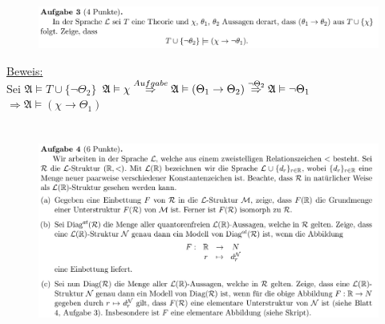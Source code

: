 \documentclass[a4paper]{scrartcl}
\begin{document}
\section*{}%
\label{sec:aufgabe_3}

    \begin{figure}[H]
        \centering
        \includegraphics[scale=0.3]{./A-3.png}
        \label{fig:}
    \end{figure}

    \underline{Beweis:}\\
        Sei $\mathfrak{A} \vDash T \cup \{\neg \Theta_2\}$
        $\mathfrak{A} \vDash \chi\\
        \overset{Aufgabe}{\Rightarrow} \mathfrak{A} \vDash (\Theta_1 \rightarrow \Theta_2)\\
        \overset{\neg \Theta_2}{\Rightarrow} \mathfrak{A} \vDash \neg \Theta_1$\\
        $\Rightarrow \mathfrak{A} \vDash (\chi \rightarrow \Theta_1)$\\


\section*{}%
\label{sec:aufgabe_4}

    \begin{figure}[H]
        \centering
        \includegraphics[scale=0.3]{./A-4.png}
        \label{fig:}
    \end{figure}
\end{document}
